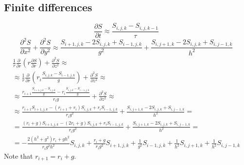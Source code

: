\documentclass[a4paper,10pt]{article}
\begin{document}
\subsection{Finite differences}

\begin{equation}
    \frac{\partial S}{\partial t}
    \approx
    \frac{S_{i,j,k} - S_{i,j,k-1}}{\tau}
\end{equation}
\begin{equation}
    \frac{\partial^2 S}{\partial x^2} + \frac{\partial^2 S}{\partial y^2}
    \approx
    \frac{S_{i+1,j,k} - 2 S_{i,j,k} + S_{i-1,j,k}}{g^2} +
    \frac{S_{i,j+1,k} - 2 S_{i,j,k} + S_{i,j-1,k}}{h^2}
\end{equation}
\begin{multline}
    \frac{1}{r} \frac{\partial}{\partial r}
    \left( r \frac{\partial S}{\partial r} \right) +
    \frac{\partial^2 S}{\partial z^2}
    \approx
    \\%
    \approx
    \frac{1}{r}\frac{\partial}{\partial r}\left(r_i \frac{S_{i,j,k} - S_{i-1,j,k}}{g} \right) +
    \frac{\partial^2 S}{\partial z^2}
    \approx
    \\%
    \approx
    \frac{ r_{i+1}\frac{S_{i+1,j,k} - S_{i,j,k}}{g} - r_{i}\frac{S_{i,j,k} - S_{i-1,j,k}}{g}}{r_i g} +
    \frac{\partial^2 S}{\partial z^2}
    \approx
    \\%
    \approx
    \frac{ r_{i+1}S_{i+1,j,k} - (r_{i+1} + r_i)S_{i,j,k} + r_i S_{i-1,j,k} }{r_i g^2} +
    \frac{S_{i,j+1,k} - 2 S_{i,j,k} + S_{i,j-1,k}}{h^2}
    =
    \\%
    =
    \frac{ (r_i + g)S_{i+1,j,k} - (2 r_i + g)S_{i,j,k} + r_i S_{i-1,j,k} }{r_i g^2} +
    \frac{S_{i,j+1,k} - 2 S_{i,j,k} + S_{i,j-1,k}}{h^2}
    =
    \\%
    =
    -\frac{2 (h^2 + g^2) r_i + g h^2}{r_i g^2 h^2}  S_{i,j,k}
    +\frac{r_i + g}{r_i g^2}                        S_{i+1,j,k}
    +\frac{1}{g^2}                                  S_{i-1,j,k}
    +\frac{1}{h^2}                                  S_{i,j+1,k}
    +\frac{1}{h^2}                                  S_{i,j-1,k}
\end{multline}
Note that $r_{i+1} = r_i + g$.




\end{document}
